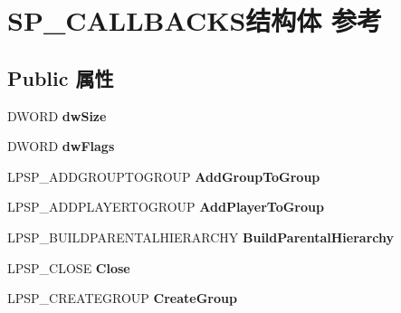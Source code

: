 \hypertarget{struct_s_p___c_a_l_l_b_a_c_k_s}{}\section{S\+P\+\_\+\+C\+A\+L\+L\+B\+A\+C\+K\+S结构体 参考}
\label{struct_s_p___c_a_l_l_b_a_c_k_s}
\subsection*{Public 属性}
\begin{DoxyCompactItemize}
\item 
\mbox{\label{struct_s_p___c_a_l_l_b_a_c_k_s_ac8357a470dbbde634516e8ce5a3d547c}} 
D\+W\+O\+RD {\bfseries dw\+Size}
\item 
\mbox{\label{struct_s_p___c_a_l_l_b_a_c_k_s_afe439de0b019584dfefaf5b071673e29}} 
D\+W\+O\+RD {\bfseries dw\+Flags}
\item 
\mbox{\label{struct_s_p___c_a_l_l_b_a_c_k_s_a9e4801ee7ed0d08d24c06abaaaf1a54f}} 
L\+P\+S\+P\+\_\+\+A\+D\+D\+G\+R\+O\+U\+P\+T\+O\+G\+R\+O\+UP {\bfseries Add\+Group\+To\+Group}
\item 
\mbox{\label{struct_s_p___c_a_l_l_b_a_c_k_s_a7c58184a5a8964b66d402aaa344127c3}} 
L\+P\+S\+P\+\_\+\+A\+D\+D\+P\+L\+A\+Y\+E\+R\+T\+O\+G\+R\+O\+UP {\bfseries Add\+Player\+To\+Group}
\item 
\mbox{\label{struct_s_p___c_a_l_l_b_a_c_k_s_ad2b924609529499cc7163a9764bab3aa}} 
L\+P\+S\+P\+\_\+\+B\+U\+I\+L\+D\+P\+A\+R\+E\+N\+T\+A\+L\+H\+I\+E\+R\+A\+R\+C\+HY {\bfseries Build\+Parental\+Hierarchy}
\item 
\mbox{\label{struct_s_p___c_a_l_l_b_a_c_k_s_aaa9615486a3710b0533ec4d1fa47fae4}} 
L\+P\+S\+P\+\_\+\+C\+L\+O\+SE {\bfseries Close}
\item 
\mbox{\label{struct_s_p___c_a_l_l_b_a_c_k_s_ae626e74146a2019a5e2439721da31c77}} 
L\+P\+S\+P\+\_\+\+C\+R\+E\+A\+T\+E\+G\+R\+O\+UP {\bfseries Create\+Group}
\item 

\end{DoxyCompactItemize}
